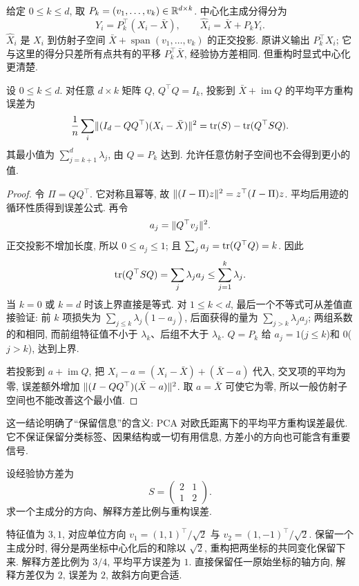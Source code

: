 给定 $0\leq k\leq d$, 取 $P_k=(v_1,\ldots,v_k)\in\mathbb R^{d\times k}$. 中心化主成分得分为
\[
 Y_i=P_k^\top(X_i-\bar X),\qquad
 \widehat X_i=\bar X+P_kY_i.
\]
$\widehat X_i$ 是 $X_i$ 到仿射子空间 $\bar X+\operatorname{span}(v_1,\ldots,v_k)$ 的正交投影. 原讲义输出 $P_k^\top X_i$; 它与这里的得分只差所有点共有的平移 $P_k^\top\bar X$, 经验协方差相同. 但重构时显式中心化更清楚. 

\begin{theorem}
设 $0\leq k\leq d$. 对任意 $d\times k$ 矩阵 $Q$, $Q^\top Q=I_k$, 投影到 $\bar X+\operatorname{im}Q$ 的平均平方重构误差为
\[
 \frac1n\sum_i\lVert (I_d-QQ^\top)(X_i-\bar X)\rVert^2
 =\operatorname{tr}(S)-\operatorname{tr}(Q^\top SQ).
\]
其最小值为 $\sum_{j=k+1}^d\lambda_j$, 由 $Q=P_k$ 达到. 允许任意仿射子空间也不会得到更小的值. 
\end{theorem}
\begin{proof}
令 $\Pi=QQ^\top$. 它对称且幂等, 故 $\lVert (I-\Pi)z\rVert^2=z^\top(I-\Pi)z$. 平均后用迹的循环性质得到误差公式. 再令
\[
 a_j=\lVert Q^\top v_j\rVert^2.
\]
正交投影不增加长度, 所以 $0\leq a_j\leq1$; 且 $\sum_j a_j=\operatorname{tr}(Q^\top Q)=k$. 因此
\[
 \operatorname{tr}(Q^\top SQ)=\sum_j\lambda_ja_j\leq\sum_{j=1}^k\lambda_j.
\]
当 $k=0$ 或 $k=d$ 时该上界直接是等式. 对 $1\leq k<d$, 最后一个不等式可从差值直接验证: 前 $k$ 项损失为 $\sum_{j\leq k}\lambda_j(1-a_j)$, 后面获得的量为 $\sum_{j>k}\lambda_ja_j$; 两组系数的和相同, 而前组特征值不小于 $\lambda_k$、后组不大于 $\lambda_k$. $Q=P_k$ 给 $a_j=1$($j\leq k$)和 $0$($j>k$), 达到上界. 

若投影到 $a+\operatorname{im}Q$, 把 $X_i-a=(X_i-\bar X)+(\bar X-a)$ 代入, 交叉项的平均为零, 误差额外增加 $\lVert (I-QQ^\top)(\bar X-a)\rVert^2$. 取 $a=\bar X$ 可使它为零, 所以一般仿射子空间也不能改善这个最小值. 
\end{proof}
这一结论明确了“保留信息”的含义: PCA 对欧氏距离下的平均平方重构误差最优. 它不保证保留分类标签、因果结构或一切有用信息, 方差小的方向也可能含有重要信号. 

\begin{example}
设经验协方差为
\[
 S=\begin{pmatrix}2&1\\1&2\end{pmatrix}.
\]
求一个主成分的方向、解释方差比例与重构误差.
\end{example}
\begin{solution}
特征值为 $3,1$, 对应单位方向 $v_1=(1,1)^\top/\sqrt2$ 与 $v_2=(1,-1)^\top/\sqrt2$. 保留一个主成分时, 得分是两坐标中心化后的和除以 $\sqrt2$, 重构把两坐标的共同变化保留下来. 解释方差比例为 $3/4$, 平均平方误差为 $1$. 直接保留任一原始坐标的轴方向, 解释方差仅为 $2$, 误差为 $2$, 故斜方向更合适. 
\end{solution}

